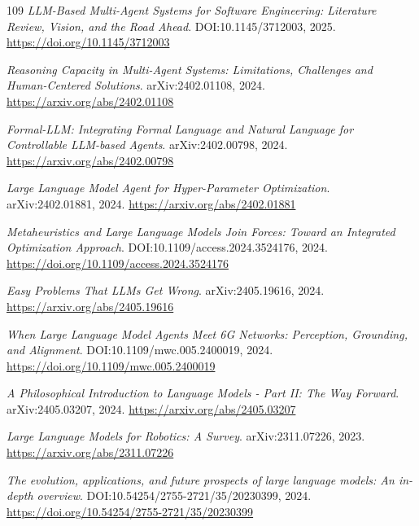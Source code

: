 \documentclass[11pt,a4paper]{article}
\begin{document}
\begin{thebibliography}{109}
\newblock \emph{LLM-Based Multi-Agent Systems for Software Engineering: Literature Review, Vision, and the Road Ahead}.
\newblock DOI:10.1145/3712003, 2025.
\newblock \url{https://doi.org/10.1145/3712003}

\newblock \emph{Reasoning Capacity in Multi-Agent Systems: Limitations, Challenges and Human-Centered Solutions}.
\newblock arXiv:2402.01108, 2024.
\newblock \url{https://arxiv.org/abs/2402.01108}

\newblock \emph{Formal-LLM: Integrating Formal Language and Natural Language for Controllable LLM-based Agents}.
\newblock arXiv:2402.00798, 2024.
\newblock \url{https://arxiv.org/abs/2402.00798}

\newblock \emph{Large Language Model Agent for Hyper-Parameter Optimization}.
\newblock arXiv:2402.01881, 2024.
\newblock \url{https://arxiv.org/abs/2402.01881}

\newblock \emph{Metaheuristics and Large Language Models Join Forces: Toward an Integrated Optimization Approach}.
\newblock DOI:10.1109/access.2024.3524176, 2024.
\newblock \url{https://doi.org/10.1109/access.2024.3524176}

\newblock \emph{Easy Problems That LLMs Get Wrong}.
\newblock arXiv:2405.19616, 2024.
\newblock \url{https://arxiv.org/abs/2405.19616}

\newblock \emph{When Large Language Model Agents Meet 6G Networks: Perception, Grounding, and Alignment}.
\newblock DOI:10.1109/mwc.005.2400019, 2024.
\newblock \url{https://doi.org/10.1109/mwc.005.2400019}

\newblock \emph{A Philosophical Introduction to Language Models - Part II: The Way Forward}.
\newblock arXiv:2405.03207, 2024.
\newblock \url{https://arxiv.org/abs/2405.03207}

\newblock \emph{Large Language Models for Robotics: A Survey}.
\newblock arXiv:2311.07226, 2023.
\newblock \url{https://arxiv.org/abs/2311.07226}

\newblock \emph{The evolution, applications, and future prospects of large language models: An in-depth overview}.
\newblock DOI:10.54254/2755-2721/35/20230399, 2024.
\newblock \url{https://doi.org/10.54254/2755-2721/35/20230399}


\end{thebibliography}
\end{document}
